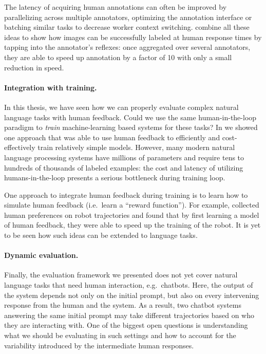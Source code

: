 The latency of acquiring human annotations can often be improved by parallelizing across multiple annotators, optimizing the annotation interface  or batching similar tasks to decrease worker context switching.
\citet{krishna2016embracing} combine all these ideas to show how images can be successfully labeled at human response times by tapping into the annotator's reflexes: once aggregated over several annotators, they are able to speed up annotation by a factor of 10 with only a small reduction in speed.

\paragraph{Integration with training.}
In this thesis, we have seen how we can properly evaluate complex natural language tasks with human feedback.
Could we use the same human-in-the-loop paradigm to \textit{train} machine-learning based systems for these tasks?
In  we showed one approach that was able to use human feedback to efficiently and cost-effectively train relatively simple models.
However, many modern natural language processing systems have millions of parameters and require tens to hundreds of thousands of labeled examples:
  the cost and latency of utilizing humans-in-the-loop presents a serious bottleneck during training loop.

One approach to integrate human feedback during training is to learn how to simulate human feedback (i.e.\ learn a ``reward function'').
For example, \citet{christiano2017deep} collected human preferences on robot trajectories and found that by first learning a model of human feedback, they were able to speed up the training of the robot.
It is yet to be seen how such ideas can be extended to language tasks.

\paragraph{Dynamic evaluation.}
Finally, the evaluation framework we presented does not yet cover natural language tasks that need human interaction, e.g.\ chatbots.
Here, the output of the system depends not only on the initial prompt, but also on every intervening response from the human and the system.
As a result, two chatbot systems answering the same initial prompt may take different trajectories based on who they are interacting with.
One of the biggest open questions is understanding what we should be evaluating in such settings and how to account for the variability introduced by the intermediate human responses.

